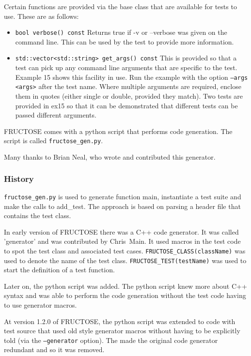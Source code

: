 \documentclass{book}
\begin{document}
Certain functions are provided via the base class that are available for tests to use.
These are as follows:

\begin{itemize}

\item {\tt bool verbose() const}\hfil\break
Returns true if -v or --verbose was given on the command line.
This can be used by the test to provide more information.

\item {\tt std::vector<std::string> get\_args() const}\hfil\break
This is provided so that a test can pick up any command line arguments
that are specific to the test. Example 15 shows this facility in use.
Run the example with the option {\tt --args <args>} after the test name.
Where multiple arguments are required, enclose them in quotes (either single
or double, provided they match). Two tests are provided in ex15 so that
it can be demonstrated that different tests can be passed different arguments.
\end{itemize}

\label{generator}

FRUCTOSE comes with a python script that performs code generation.
The script is called {\tt fructose\_gen.py}.

Many thanks to Brian Neal, who wrote and contributed this generator.

\subsubsection{History}

{\tt fructose\_gen.py} is used to generate function main, 
instantiate a test suite and make the calls to add\_test. 
The approach is  based on parsing a header file that contains the test class. 

In early version of FRUCTOSE there was a C++ code generator.
It was called 'generator' and was contributed by Chris~Main.
It used macros in the test code to spot the test class and associated test cases. 
{\tt FRUCTOSE\_CLASS(className)} was used to denote the
name of the test class. {\tt FRUCTOSE\_TEST(testName)} was used
to start the definition of a test function.

Later on, the python script was added. The python script knew more about
C++ syntax and was able to perform the code generation without the test code
having to use generator macros.

At version 1.2.0 of FRUCTOSE, the python script was extended to code with
test source that used old style generator macros without having to be
explicitly told (via the {\tt --generator} option). 
The made the original code generator redundant and so it was removed.
\end{document}
